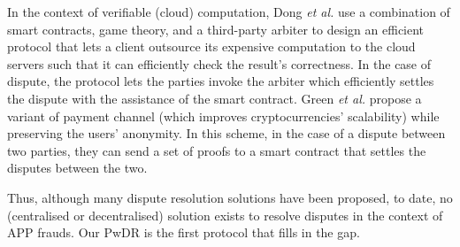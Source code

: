 In the context of verifiable (cloud) computation, Dong \textit{et al.} \cite{DongWAMM17} use a combination of smart contracts, game theory, and a   third-party arbiter to design an efficient protocol that lets a client outsource its expensive computation to the cloud servers such that it can efficiently check the result's correctness. In the case of dispute, the protocol lets the parties invoke the  arbiter which efficiently settles the dispute with the assistance of the smart contract. Green \textit{et al.} \cite{Bolt} propose a variant  of  payment channel \cite{Lightning-Network} (which improves cryptocurrencies' scalability) while preserving the users' anonymity. In this scheme, in the case of a dispute between two parties, they can send a set of proofs to a smart contract that settles the disputes between the two. 











 

Thus, although many dispute resolution solutions have been proposed, to date, no  (centralised or decentralised) solution exists to resolve disputes in the context of APP frauds. Our PwDR is the first protocol that fills in the gap. 

